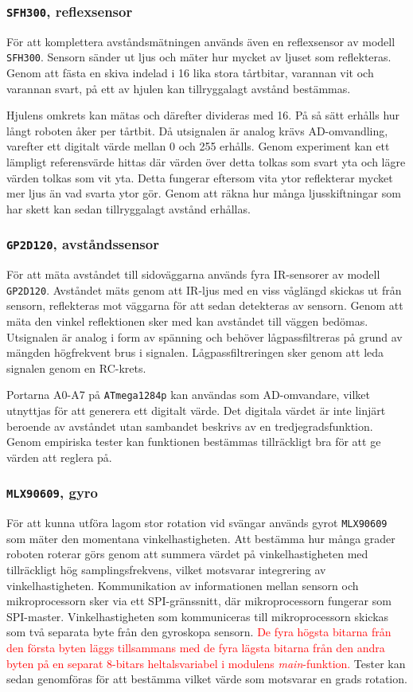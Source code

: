 \documentclass[11pt]{article}
\begin{document}
\begin{flushleft}
\subsubsection{\texttt{SFH300}, reflexsensor}
För att komplettera avståndsmätningen används även en reflexsensor av modell \verb+SFH300+. Sensorn sänder ut ljus och mäter hur mycket av ljuset som reflekteras. Genom att fästa en skiva indelad i 16 lika stora tårtbitar, varannan vit och varannan svart, på ett av hjulen kan tillryggalagt avstånd bestämmas.

Hjulens omkrets kan mätas och därefter divideras med 16. På så sätt erhålls hur långt roboten åker per tårtbit.
Då utsignalen är analog krävs AD-omvandling, varefter ett digitalt värde mellan 0 och 255 erhålls. Genom experiment kan ett lämpligt referensvärde hittas där värden över detta tolkas som svart yta och lägre värden tolkas som vit yta. Detta fungerar eftersom vita ytor reflekterar mycket mer ljus än vad svarta ytor gör. Genom att räkna hur många ljusskiftningar som har skett kan sedan tillryggalagt avstånd erhållas.

\subsubsection{\texttt{GP2D120}, avståndssensor}
För att mäta avståndet till sidoväggarna används fyra IR-sensorer av modell \verb+GP2D120+. Avståndet mäts genom att IR-ljus med en viss våglängd skickas ut från sensorn, reflekteras mot väggarna för att sedan detekteras av sensorn. Genom att mäta den vinkel reflektionen sker med kan avståndet till väggen bedömas. Utsignalen är analog i form av spänning och behöver lågpassfiltreras på grund av mängden högfrekvent brus i signalen. Lågpassfiltreringen sker genom att leda signalen genom en RC-krets. 

Portarna A0-A7 på \verb+ATmega1284p+ kan användas som AD-omvandare, vilket utnyttjas för att generera ett digitalt värde. Det digitala värdet är inte linjärt beroende av avståndet utan sambandet beskrivs av en tredjegradsfunktion. Genom empiriska tester kan funktionen bestämmas tillräckligt bra för att ge värden att reglera på.

\subsubsection{\texttt{MLX90609}, gyro}
För att kunna utföra lagom stor rotation vid svängar används gyrot \verb+MLX90609+ som mäter den momentana vinkelhastigheten. Att bestämma hur många grader roboten roterar görs genom att summera värdet på vinkelhastigheten med tillräckligt hög samplingsfrekvens, vilket motsvarar integrering av vinkelhastigheten. Kommunikation av informationen mellan sensorn och mikroprocessorn sker via ett SPI-gränssnitt, där mikroprocessorn fungerar som SPI-master. Vinkelhastigheten som kommuniceras till mikroprocessorn skickas som två separata byte från den gyroskopa sensorn. \textcolor{red}{De fyra högsta bitarna från den första byten läggs tillsammans med de fyra lägsta bitarna från den andra byten på en separat 8-bitars heltalsvariabel i modulens \textit{main}-funktion.} Tester kan sedan genomföras för att bestämma vilket värde som motsvarar en grads rotation.  


\end{flushleft}
\end{document}
